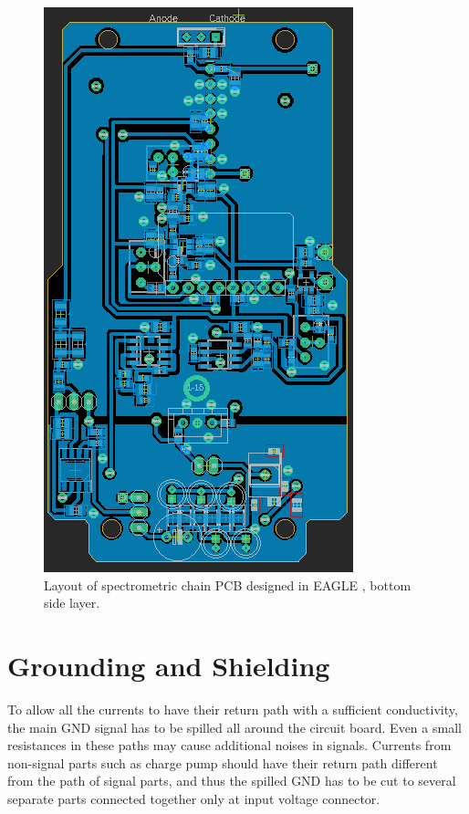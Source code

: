 \begin{figure}[H]
 \centering
 \includegraphics[scale=0.8, angle = 90]{./pictures/S14bottomLay.png}
 \caption{Layout of spectrometric chain PCB designed in EAGLE \cite{eagle}, bottom side layer.}
 \label{layout bottom}
 
\end{figure}
\newpage





\section{Grounding and Shielding}
To allow all the currents to have their return path with a sufficient conductivity, the main GND signal has to be spilled all around the circuit board. Even a small resistances in these paths may cause additional noises in signals. Currents from non-signal parts such as charge pump should have their return path different from the path of signal parts, and thus the spilled GND has to be cut to several separate parts connected together only at input voltage connector.

